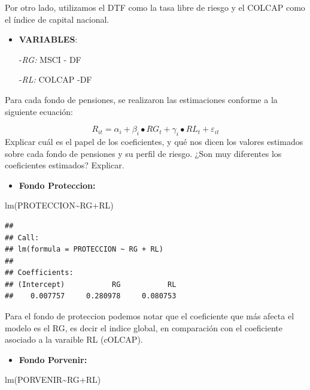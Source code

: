 \documentclass[
  12pt,
]{article}
\newenvironment{Shaded}{\begin{snugshade}}{\end{snugshade}}
\newcommand{\FunctionTok}[1]{\textcolor[rgb]{0.00,0.00,0.00}{#1}}
\newcommand{\NormalTok}[1]{#1}
\newcommand{\SpecialCharTok}[1]{\textcolor[rgb]{0.00,0.00,0.00}{#1}}
\providecommand{\tightlist}{%
  \setlength{\itemsep}{0pt}\setlength{\parskip}{0pt}}
\begin{document}
Por otro lado, utilizamos el DTF como la tasa libre de riesgo y el
COLCAP como el índice de capital nacional.

\begin{itemize}
\item
  \textbf{VARIABLES}:

  -\emph{RG:} MSCI - DF

  -\emph{RL:} COLCAP -DF
\end{itemize}

Para cada fondo de pensiones, se realizaron las estimaciones conforme a
la siguiente ecuación:

\[
R_{it}=\alpha_i+\beta_i\bullet{RG}_t+\gamma_i\bullet{RL}_t+\varepsilon_{it}
\] Explicar cuál es el papel de los coeficientes, y qué nos dicen los
valores estimados sobre cada fondo de pensiones y su perfil de riesgo.
¿Son muy diferentes los coeficientes estimados? Explicar.

\begin{itemize}
\tightlist
\item
  \textbf{Fondo Proteccion:}
\end{itemize}

\begin{Shaded}
\begin{Highlighting}[]
\FunctionTok{lm}\NormalTok{(PROTECCION}\SpecialCharTok{\textasciitilde{}}\NormalTok{RG}\SpecialCharTok{+}\NormalTok{RL)}
\end{Highlighting}
\end{Shaded}

\begin{verbatim}
## 
## Call:
## lm(formula = PROTECCION ~ RG + RL)
## 
## Coefficients:
## (Intercept)           RG           RL  
##    0.007757     0.280978     0.080753
\end{verbatim}

Para el fondo de proteccion podemos notar que el coeficiente que más
afecta el modelo es el RG, es decir el indice global, en comparación con
el coeficiente asociado a la varaible RL (cOLCAP).

\begin{itemize}
\tightlist
\item
  \textbf{Fondo Porvenir:}
\end{itemize}

\begin{Shaded}
\begin{Highlighting}[]
\FunctionTok{lm}\NormalTok{(PORVENIR}\SpecialCharTok{\textasciitilde{}}\NormalTok{RG}\SpecialCharTok{+}\NormalTok{RL)}
\end{Highlighting}
\end{Shaded}
\end{document}
